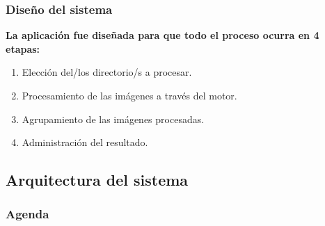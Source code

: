 \begin{frame}[t,fragile]
\frametitle {Diseño del sistema}
\textbf{La aplicación fue diseñada para que todo el proceso ocurra en 4 etapas:}
\vspace{5mm}
\begin{enumerate}{}
	\item Elección del/los directorio/s a procesar.
	\vspace{4mm}
	\item Procesamiento de las imágenes a través del motor.
	\vspace{4mm}
	\item Agrupamiento de las imágenes procesadas.
	\vspace{4mm}
	\item Administración del resultado.
\end{enumerate}

\end{frame}	
\subsection{Arquitectura del sistema}

\watermarkon
\begin{frame}
\frametitle{Agenda}

\end{frame}
\watermarkoff


